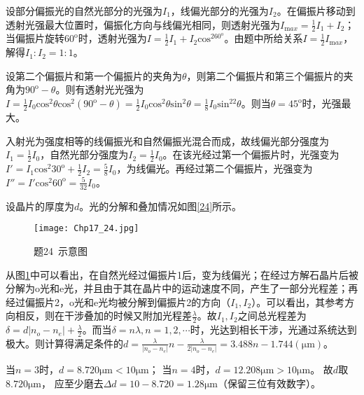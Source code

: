 \solve 设部分偏振光的自然光部分的光强为$I_1$，线偏光部分的光强为$I_2$。在偏振片移动到透射光强最大位置时，偏振化方向与线偏光相同，则透射光强为$I_{\mathrm max}=\frac{1}{2}I_1+I_2$；当偏振片旋转$60^{\mathrm{o}}$时，透射光强为$I=\frac{1}{2}I_1+I_2\mathrm{cos}^260^{\mathrm{o}}$。由题中所给关系$I=\frac{1}{2}I_{\mathrm max}$，解得$I_1:I_2=1:1$。

\exercise

\solve 设第二个偏振片和第一个偏振片的夹角为$\theta$，则第二个偏振片和第三个偏振片的夹角为$90^{\mathrm{o}}-\theta$。则有透射光光强为$I=\frac{1}{2}I_0\mathrm{cos}^2\theta\mathrm{cos}^2(90^{\mathrm{o}}-\theta)=\frac{1}{2}I_0\mathrm{cos}^2\theta\mathrm{sin}^2\theta=\frac{1}{8}I_0\mathrm{sin}^22\theta$。则当$\theta=45^{\mathrm{o}}$时，光强最大。

\exercise

\solve 入射光为强度相等的线偏振光和自然偏振光混合而成，故线偏光部分强度为$I_1=\frac{1}{2}I_0$，自然光部分强度为$I_2=\frac{1}{2}I_0$。在该光经过第一个偏振片时，光强变为$I'=I_1\mathrm{cos}^2 30^{\mathrm{o}}+\frac{1}{2}I_2=\frac{5}{8}I_0$，为线偏光。再经过第二个偏振片，光强变为$I''=I'\mathrm{cos}^2 60^{\mathrm{o}}=\frac{5}{32}I_0$。

\exercise

\solve 设晶片的厚度为$d$。光的分解和叠加情况如图\ref{24}所示。

\begin{figure}[htbp]
	\centering
	\texttt{[image: Chp17\_24.jpg]}
	\caption{题24\ 示意图}
	\label{fig:17_24}
\end{figure}

从图\ref{fig:17_24}中可以看出，在自然光经过偏振片1后，变为线偏光；在经过方解石晶片后被分解为o光和e光，并且由于其在晶片中的运动速度不同，产生了一部分光程差；再经过偏振片2，o光和e光均被分解到偏振片2的方向（$I_1,I_2$）。可以看出，其参考方向相反，则在干涉叠加的时候又附加光程差$\frac{\lambda}{2}$。故$I_1,I_2$之间总光程差为$\delta=d|n_o-n_e|+\frac{\lambda}{2}$。而当$\delta=n\lambda,n=1,2,\cdots$时，光达到相长干涉，光通过系统达到极大。则计算得满足条件的$d=\frac{\lambda}{|n_o-n_e|}n-\frac{\lambda}{2|n_o-n_e|}=3.488n-1.744(\mathrm{\mu m})$。

当$n=3$时，$d=8.720 \mathrm{\mu m}<10 \mathrm{\mu m}$；
当$n=4$时，$d=12.208 \mathrm{\mu m}>10 \mathrm{\mu m}$。
故$d$取$8.720 \mathrm{\mu m}$，
应至少磨去$\Delta d=10-8.720=1.28 \mathrm{\mu m}$（保留三位有效数字）。
